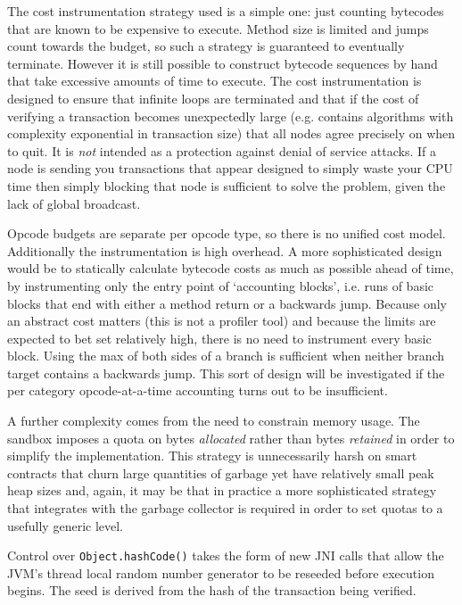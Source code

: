 \documentclass{article}
\begin{document}
The cost instrumentation strategy used is a simple one: just counting bytecodes that are known to be expensive to execute.
Method size is limited and jumps count towards the budget, so such a strategy is guaranteed to eventually terminate. However
it is still possible to construct bytecode sequences by hand that take excessive amounts of time to execute. The cost
instrumentation is designed to ensure that infinite loops are terminated and that if the cost of verifying a transaction
becomes unexpectedly large (e.g. contains algorithms with complexity exponential in transaction size) that all nodes agree
precisely on when to quit. It is \emph{not} intended as a protection against denial of service attacks. If a node is sending
you transactions that appear designed to simply waste your CPU time then simply blocking that node is sufficient to solve
the problem, given the lack of global broadcast.

Opcode budgets are separate per opcode type, so there is no unified cost model. Additionally the instrumentation is high
overhead. A more sophisticated design would be to statically calculate bytecode costs as much as possible ahead of time,
by instrumenting only the entry point of `accounting blocks', i.e. runs of basic blocks that end with either a method return
or a backwards jump. Because only an abstract cost matters (this is not a profiler tool) and because the limits are expected
to bet set relatively high, there is no need to instrument every basic block. Using the max of both sides of a branch is
sufficient when neither branch target contains a backwards jump. This sort of design will be investigated if the per category
opcode-at-a-time accounting turns out to be insufficient.

A further complexity comes from the need to constrain memory usage. The sandbox imposes a quota on bytes \emph{allocated}
rather than bytes \emph{retained} in order to simplify the implementation. This strategy is unnecessarily harsh on smart
contracts that churn large quantities of garbage yet have relatively small peak heap sizes and, again, it may be that
in practice a more sophisticated strategy that integrates with the garbage collector is required in order to set
quotas to a usefully generic level.

Control over \texttt{Object.hashCode()} takes the form of new JNI calls that allow the JVM's thread local random number
generator to be reseeded before execution begins. The seed is derived from the hash of the transaction being verified.
\end{document}
